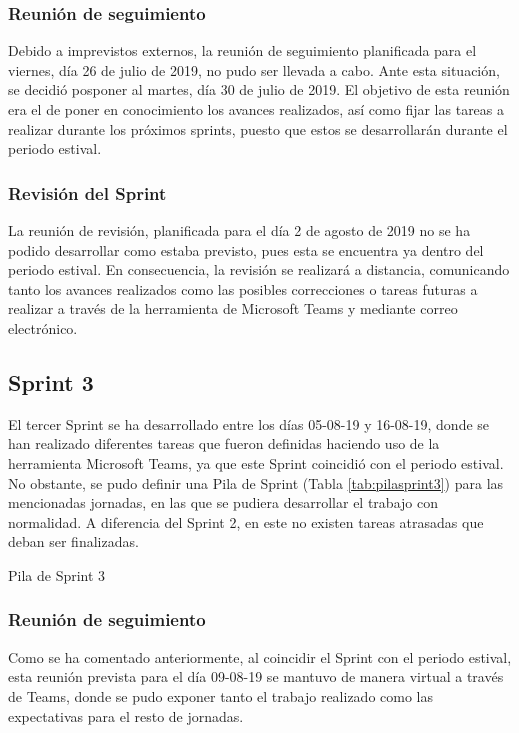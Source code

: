 \subsubsection{Reunión de seguimiento}
Debido a imprevistos externos, la reunión de seguimiento planificada para el viernes, día 26 de julio de 2019, no pudo ser llevada a cabo. Ante esta situación, se decidió posponer al martes, día 30 de julio de 2019. El objetivo de esta reunión era el de poner en conocimiento los avances realizados, así como fijar las tareas a realizar durante los próximos sprints, puesto que estos se desarrollarán durante el periodo estival.

\subsubsection{Revisión del Sprint}
La reunión de revisión, planificada para el día 2 de agosto de 2019 no se ha podido desarrollar como estaba previsto, pues esta se encuentra ya dentro del periodo estival. En consecuencia, la revisión se realizará a distancia, comunicando tanto los avances realizados como las posibles correcciones o tareas futuras a realizar a través de la herramienta de Microsoft Teams y mediante correo electrónico.

\clearpage

\subsection{Sprint 3}
El tercer Sprint se ha desarrollado entre los días 05-08-19 y 16-08-19, donde se han realizado diferentes tareas que fueron definidas haciendo uso de la herramienta Microsoft Teams, ya que este Sprint coincidió con el periodo estival. No obstante, se pudo definir una Pila de Sprint (Tabla \ref{tab:pilasprint3}) para las mencionadas jornadas, en las que se pudiera desarrollar el trabajo con normalidad. A diferencia del Sprint 2, en este no existen tareas atrasadas que deban ser finalizadas.

\begin{table}[!htbp]
	\centering
	{\small
		
	}
	\caption[Pila de Sprint 3]
	{Pila de Sprint 3}
	\label{tab:pilasprint3}
\end{table}

\subsubsection{Reunión de seguimiento}
Como se ha comentado anteriormente, al coincidir el Sprint con el periodo estival, esta reunión prevista para el día 09-08-19 se mantuvo de manera virtual a través de Teams, donde se pudo exponer tanto el trabajo realizado como las expectativas para el resto de jornadas.

